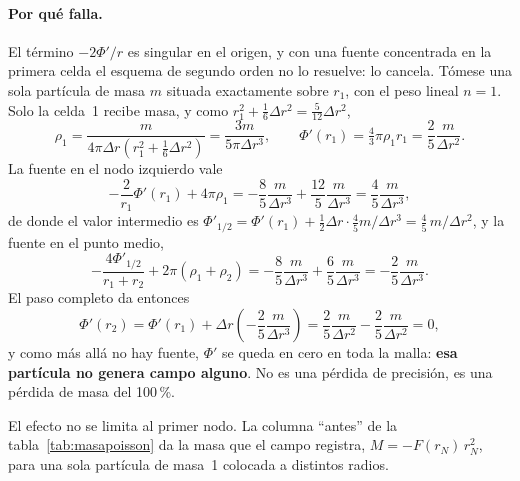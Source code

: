 \documentclass[11pt,a4paper]{article}
\begin{document}
\paragraph{Por qué falla.} El término $-2\Phi'/r$ es singular en el origen, y con una
fuente concentrada en la primera celda el esquema de segundo orden no lo resuelve: lo
cancela. Tómese una sola partícula de masa $m$ situada exactamente sobre $r_1$, con el
peso lineal $n=1$. Solo la celda~1 recibe masa, y como
$r_1^2+\tfrac16\Delta r^2=\tfrac{5}{12}\Delta r^2$,
\begin{equation}
  \rho_1=\frac{m}{4\pi\Delta r\left(r_1^2+\frac{1}{6}\Delta r^2\right)}
        =\frac{3m}{5\pi\Delta r^{3}},\qquad
  \Phi'(r_1)=\tfrac43\pi\rho_1r_1=\frac{2}{5}\frac{m}{\Delta r^{2}} .
\end{equation}
La fuente en el nodo izquierdo vale
\begin{equation}
  -\frac{2}{r_1}\Phi'(r_1)+4\pi\rho_1
  =-\frac{8}{5}\frac{m}{\Delta r^{3}}+\frac{12}{5}\frac{m}{\Delta r^{3}}
  =\frac{4}{5}\frac{m}{\Delta r^{3}},
\end{equation}
de donde el valor intermedio es
$\Phi'_{1/2}=\Phi'(r_1)+\tfrac12\Delta r\cdot\tfrac45 m/\Delta r^3
=\tfrac45\,m/\Delta r^{2}$, y la fuente en el punto medio,
\begin{equation}
  -\frac{4\Phi'_{1/2}}{r_1+r_2}+2\pi(\rho_1+\rho_2)
  =-\frac{8}{5}\frac{m}{\Delta r^{3}}+\frac{6}{5}\frac{m}{\Delta r^{3}}
  =-\frac{2}{5}\frac{m}{\Delta r^{3}} .
\end{equation}
El paso completo da entonces
\begin{equation}
  \Phi'(r_2)=\Phi'(r_1)+\Delta r\left(-\frac{2}{5}\frac{m}{\Delta r^{3}}\right)
  =\frac{2}{5}\frac{m}{\Delta r^{2}}-\frac{2}{5}\frac{m}{\Delta r^{2}}=0 ,
\end{equation}
y como más allá no hay fuente, $\Phi'$ se queda en cero en toda la malla:
\textbf{esa partícula no genera campo alguno}. No es una pérdida de precisión, es una
pérdida de masa del 100\,\%.

El efecto no se limita al primer nodo. La columna ``antes'' de la
tabla~\ref{tab:masapoisson} da la masa que el campo registra,
$M=-F(r_{N})\,r_{N}^{2}$, para una sola partícula de masa~1 colocada a distintos radios.
\end{document}
